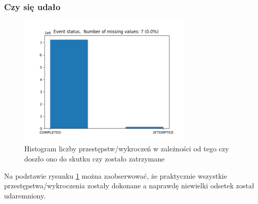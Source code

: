 \documentclass{classrep}
\begin{document}
{{            \subsubsection{Czy się udało} {
                \begin{figure}[!htbp]
                    \centering
                    \includegraphics[width=0.75\textwidth]{img/Eventstatus-133630.png}
                    \caption{Histogram liczby przestępstw/wykroczeń w zależności od tego czy doszło ono do skutku czy zostało zatrzymane}
                    \label{hist_is_completed}
                \end{figure}
                \FloatBarrier
                Na podstawie rysunku \ref{hist_is_completed} można zaobserwować, że praktycznie wszystkie przestępstwa/wykroczenia zostały dokonane a naprawdę niewielki odsetek został udaremniony.
            }

}}
\end{document}
